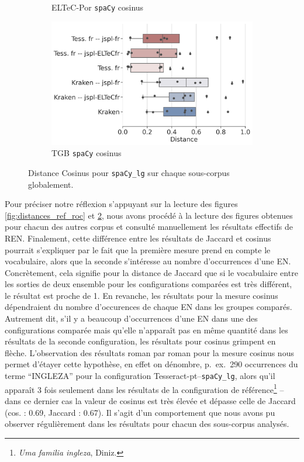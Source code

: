 \begin{figure}[h!]
\begin{subfigure}{0.5\textwidth}
        \caption{ELTeC-Por \texttt{spaCy} cosinus} 
         \label{fig:ELTeC-Por-spaCy-cosinus}
   \end{subfigure}
     \begin{subfigure}{0.5\textwidth}
  \includegraphics[height=.65\textwidth]{IMAGES/Boite-moustache/TGB_spaCy3.5.1_cosinus.png} 
        \caption{TGB \texttt{spaCy} cosinus}
   \end{subfigure}
    \caption{Distance Cosinus pour \texttt{spaCy\_lg} sur chaque sous-corpus globalement.}
\label{fig:Cosinus-spacy-lg}
\end{figure}


Pour préciser notre réflexion s'appuyant sur la lecture des figures \ref{fig:distances_ref_roc} et \ref{fig:Cosinus-spacy-lg},
nous avons procédé à la lecture des figures obtenues pour chacun des autres corpus et consulté manuellement les résultats effectifs de REN. Finalement, cette différence entre les résultats de Jaccard et cosinus pourrait s'expliquer par le fait que la première mesure prend en compte le vocabulaire, alors que la seconde s'intéresse au nombre d'occurrences d'une EN. Concrètement, cela signifie pour la distance de Jaccard que si le vocabulaire entre les sorties de deux ensemble pour les configurations comparées est très différent, le résultat est proche de 1. 
En revanche, les résultats pour la mesure cosinus dépendraient du nombre d'occurences de chaque EN dans les groupes comparés. Autrement dit, s'il y a beaucoup d'occurrences d'une EN dans une des configurations comparée mais qu'elle n'apparaît pas en même quantité dans les résultats de la seconde configuration, les résultats pour cosinus grimpent en flèche. L'observation des résultats roman par roman pour la mesure cosinus nous permet d'étayer cette hypothèse, en effet on dénombre, p.\ ex.\, 290 occurrences du terme ``INGLEZA'' pour la configuration Tesseract-pt--\texttt{spaCy\_lg}, alors qu'il apparaît 3 fois seulement dans les résultats de la configuration de référence\footnote{\textit{Uma familia ingleza}, Diniz.} -- dans ce dernier cas la valeur de cosinus est très élevée et dépasse celle de Jaccard (cos. : 0.69, Jaccard : 0.67). Il s'agit d'un comportement que nous avons pu observer régulièrement dans les résultats pour chacun des sous-corpus analysés.

